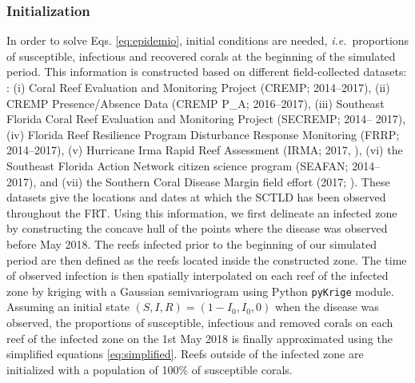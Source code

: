 \documentclass[utf8]{frontiersSCNS}
\newcommand{\ie}{{\it i.e.}\ }
\begin{document}
\subsubsection{Initialization}
In order to solve Eqs. \ref{eq:epidemio}, initial conditions are needed, \ie proportions of susceptible, infectious and recovered corals at the beginning of the simulated period. This information is constructed based on different field-collected datasets: : (i) Coral Reef Evaluation and Monitoring Project (CREMP; 2014–2017), (ii) CREMP Presence/Absence Data (CREMP P\_A; 2016–2017), (iii) Southeast Florida Coral Reef Evaluation and Monitoring Project (SECREMP; 2014– 2017), (iv) Florida Reef Resilience Program Disturbance Response Monitoring (FRRP; 2014–2017), (v) Hurricane Irma Rapid Reef Assessment (IRMA; 2017, \cite{viehman2018}), (vi) the Southeast Florida Action Network citizen science program (SEAFAN; 2014–2017), and (vii) the Southern Coral Disease Margin field effort (2017; \cite{neely2018surveying}). These datasets give the locations and dates at which the SCTLD has been observed throughout the FRT. Using this information, we first delineate an infected zone by constructing the concave hull of the points where the disease was observed before May 2018. The reefs infected prior to the beginning of our simulated period are then defined as the reefs located inside the constructed zone. The time of observed infection is then spatially interpolated on each reef of the infected zone by kriging with a Gaussian semivariogram using Python \texttt{pyKrige} module. Assuming an initial state $(S,I,R)=(1-I_0, I_0, 0)$ when the disease was observed, the proportions of susceptible, infectious and removed corals on each reef of the infected zone on the 1st May 2018 is finally approximated using the simplified equations \ref{eq:simplified}. Reefs outside of the infected zone are initialized with a population of 100\% of susceptible corals.  
\end{document}
